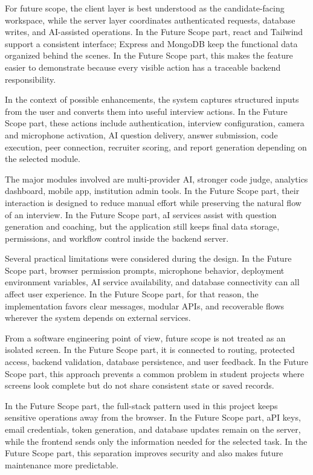 \documentclass[12pt,a4paper]{report}
\begin{document}
For future scope, the client layer is best understood as the candidate-facing workspace, while the server layer coordinates authenticated requests, database writes, and AI-assisted operations. In the Future Scope part, react and Tailwind support a consistent interface; Express and MongoDB keep the functional data organized behind the scenes. In the Future Scope part, this makes the feature easier to demonstrate because every visible action has a traceable backend responsibility.


In the context of possible enhancements, the system captures structured inputs from the user and converts them into useful interview actions. In the Future Scope part, these actions include authentication, interview configuration, camera and microphone activation, AI question delivery, answer submission, code execution, peer connection, recruiter scoring, and report generation depending on the selected module.


The major modules involved are multi-provider AI, stronger code judge, analytics dashboard, mobile app, institution admin tools. In the Future Scope part, their interaction is designed to reduce manual effort while preserving the natural flow of an interview. In the Future Scope part, aI services assist with question generation and coaching, but the application still keeps final data storage, permissions, and workflow control inside the backend server.


Several practical limitations were considered during the design. In the Future Scope part, browser permission prompts, microphone behavior, deployment environment variables, AI service availability, and database connectivity can all affect user experience. In the Future Scope part, for that reason, the implementation favors clear messages, modular APIs, and recoverable flows wherever the system depends on external services.


From a software engineering point of view, future scope is not treated as an isolated screen. In the Future Scope part, it is connected to routing, protected access, backend validation, database persistence, and user feedback. In the Future Scope part, this approach prevents a common problem in student projects where screens look complete but do not share consistent state or saved records.


In the Future Scope part, the full-stack pattern used in this project keeps sensitive operations away from the browser. In the Future Scope part, aPI keys, email credentials, token generation, and database updates remain on the server, while the frontend sends only the information needed for the selected task. In the Future Scope part, this separation improves security and also makes future maintenance more predictable.
\end{document}
